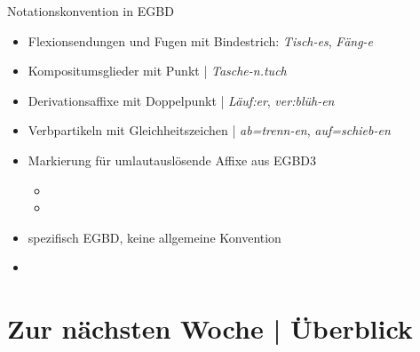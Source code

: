 \begin{frame}
  {Notationskonvention in EGBD}
  \pause
  \begin{itemize}[<+->]
    \item \alert{Flexionsendungen und Fugen} mit Bindestrich: \textit{Tisch-es}, \textit{Fäng-e}
    \item \alert{Kompositumsglieder} mit Punkt | \textit{Tasche-n.tuch}
    \item \alert{Derivationsaffixe} mit Doppelpunkt | \textit{Läuf:er}, \textit{ver:blüh-en}
    \item \alert{Verbpartikeln} mit Gleichheitszeichen | \textit{ab=trenn-en}, \textit{auf=schieb-en}
    \Halbzeile
  \item Markierung für umlautauslösende Affixe aus EGBD3 
      \begin{itemize}[<+->]
        \item {}
        \item {}
      \end{itemize}
    \Halbzeile
  \item spezifisch EGBD, keine allgemeine Konvention
  \item {}
  \end{itemize}
\end{frame}


\ifdefined\TITLE
  \section{Zur nächsten Woche | Überblick}

